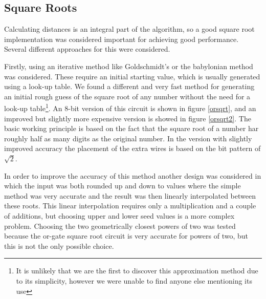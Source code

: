 		\subsection{Square Roots}

			Calculating distances is an integral part of the algorithm, so a
			good square root implementation was considered important for
			achieving good performance. Several different approaches for this
			were considered.

			Firstly, using an iterative method like Goldschmidt's or the
			babylonian method was considered. These require an initial starting
			value, which is usually generated using a look-up table. We found a
			different and very fast method for generating an initial rough
			guess of the square root of any number without the need for a
			look-up table\footnote{It is unlikely that we are the first to
			discover this approximation method due to its simplicity, however
			we were unable to find anyone else mentioning its use}. An 8-bit
			version of this circuit is shown in figure \ref{orsqrt}, and an
			improved but slightly more expensive version is showed in figure
			\ref{orsqrt2}.  The basic working principle is based on the fact
			that the square root of a number har roughly half as many digits as
			the original number. In the version with slightly improved accuracy
			the placement of the extra wires is based on the bit pattern of
			$\sqrt{2}$.

			In order to improve the accuracy of this method another design was
			considered in which the input was both rounded up and down to 
			values where the simple method was very accurate and the result was
			then linearly interpolated between these roots. This linear 
			interpolation requires only a multiplication and a couple of 
			additions, but choosing upper and lower seed values is a more 
			complex problem. Choosing the two geometrically closest powers of 
			two was tested because the or-gate square root circuit is very
			accurate for powers of two, but this is not the only possible 
			choice.

